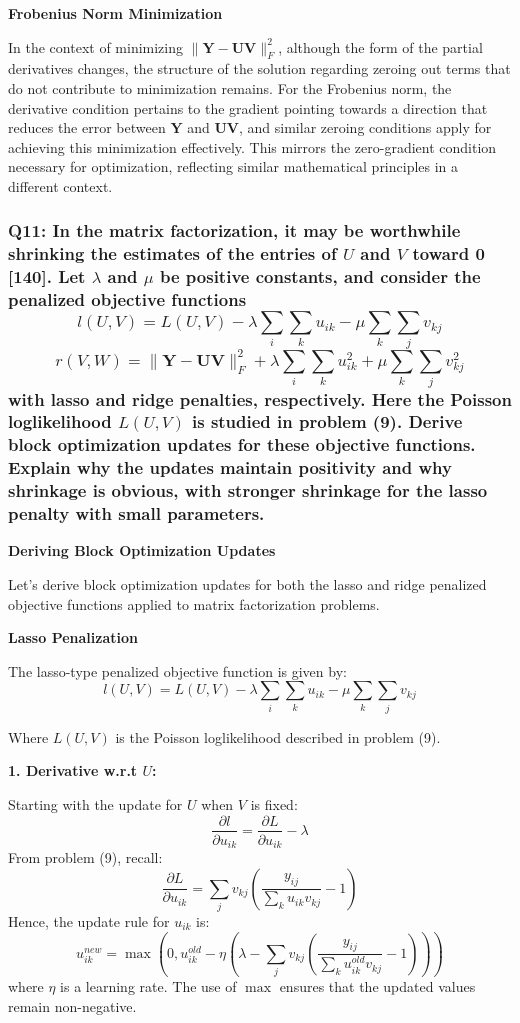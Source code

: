 \documentclass[8pt]{article}
\begin{document}
{\textbf{Frobenius Norm Minimization}

In the context of minimizing \(\|\mathbf{Y} - \mathbf{U} \mathbf{V}\|_F^2\), although the form of the partial derivatives changes, the structure of the solution regarding zeroing out terms that do not contribute to minimization remains. For the Frobenius norm, the derivative condition pertains to the gradient pointing towards a direction that reduces the error between \(\mathbf{Y}\) and \(\mathbf{U} \mathbf{V}\), and similar zeroing conditions apply for achieving this minimization effectively. This mirrors the zero-gradient condition necessary for optimization, reflecting similar mathematical principles in a different context.

\subsubsection*{Q11: In the matrix factorization, it may be worthwhile shrinking the estimates of the entries of \(U\) and \(V\) toward 0 [140]. Let \(\lambda\) and \(\mu\) be positive constants, and consider the penalized objective functions
\[
l(U, V) = L(U, V) - \lambda \sum_i \sum_k u_{ik} - \mu \sum_k \sum_j v_{kj}
\]
\[
r(V, W) = \|\mathbf{Y} - \mathbf{UV}\|_F^2 + \lambda \sum_i \sum_k u_{ik}^2 + \mu \sum_k \sum_j v_{kj}^2
\]
\noindent with lasso and ridge penalties, respectively. Here the Poisson loglikelihood \(L(U, V)\) is studied in problem (9). Derive block optimization updates for these objective functions. Explain why the updates maintain positivity and why shrinkage is obvious, with stronger shrinkage for the lasso penalty with small parameters.}

\textbf{Deriving Block Optimization Updates}

Let's derive block optimization updates for both the lasso and ridge penalized objective functions applied to matrix factorization problems. 

\textbf{Lasso Penalization}

The lasso-type penalized objective function is given by:
\[
l(U, V) = L(U, V) - \lambda \sum_i \sum_k u_{ik} - \mu \sum_k \sum_j v_{kj}
\]

Where \(L(U, V)\) is the Poisson loglikelihood described in problem (9).

\textbf{1. Derivative w.r.t \(U\):}
   
   Starting with the update for \(U\) when \(V\) is fixed:
   \[
   \frac{\partial l}{\partial u_{ik}} = \frac{\partial L}{\partial u_{ik}} - \lambda
   \]
   From problem (9), recall:
   \[
   \frac{\partial L}{\partial u_{ik}} = \sum_j v_{kj} \left( \frac{y_{ij}}{\sum_k u_{ik}v_{kj}} - 1 \right)
   \]
   Hence, the update rule for \(u_{ik}\) is:
   \[
   u_{ik}^{new} = \max\left(0, u_{ik}^{old} - \eta \left(\lambda - \sum_j v_{kj} \left( \frac{y_{ij}}{\sum_k u_{ik}^{old} v_{kj}} - 1 \right)\right)\right)
   \]
   where \(\eta\) is a learning rate. The use of \(\max\) ensures that the updated values remain non-negative.

}
\end{document}
